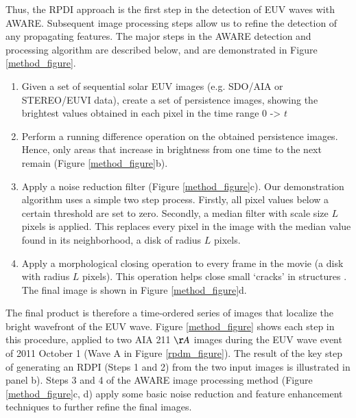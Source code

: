 Thus, the RPDI approach is the first step in the detection of EUV
waves with AWARE. Subsequent image processing steps allow us to refine
the detection of any propagating features. The major steps in the
AWARE detection and processing algorithm are described below, and are
demonstrated in Figure \ref{method_figure}.

\begin{enumerate}

\item Given a set of sequential solar EUV images (e.g. SDO/AIA or
  STEREO/EUVI data), create a set of persistence images, showing the
  brightest values obtained in each pixel in the time range 0 -> $t$

\item Perform a running difference operation on the obtained
  persistence images. Hence, only areas that increase in brightness
  from one time to the next remain (Figure \ref{method_figure}b).

\item Apply a noise reduction filter (Figure \ref{method_figure}c).
  Our demonstration algorithm uses a simple two step process.
  Firstly, all pixel values below a certain threshold are set to zero.
  Secondly, a median filter with scale size $L$ pixels is applied.
  This replaces every pixel in the image with the median value found
  in its neighborhood, a disk of radius $L$ pixels.

\item Apply a morphological closing \citep{2002dip..book.....G}
  operation to every frame in the movie (a disk with radius $L$
  pixels).  This operation helps close small ‘cracks’ in structures
  \citep{2002dip..book.....G}.  The final image is shown in Figure
  \ref{method_figure}d.
\end{enumerate}

The final product is therefore a time-ordered series of images that
localize the bright wavefront of the EUV wave. Figure
\ref{method_figure} shows each step in this procedure, applied to two
AIA 211 $\AA$ images during the EUV wave event of 2011 October 1 (Wave
A in Figure \ref{rpdm_figure}). The result of the key step of
generating an RDPI (Steps 1 and 2) from the two input images is
illustrated in panel b). Steps 3 and 4 of the AWARE image processing
method (Figure \ref{method_figure}c, d) apply some basic noise
reduction and feature enhancement techniques to further refine the
final images.

